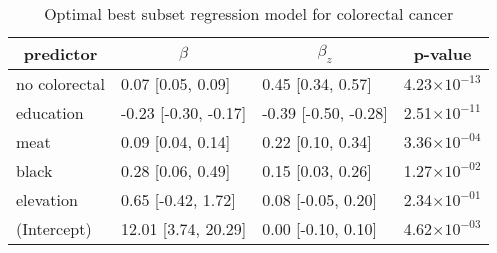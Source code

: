 \begin{table}[!tbp]
\caption{Optimal best subset regression model for colorectal cancer\label{SI_tab:colorectal}} 
\begin{center}
\begin{tabular}{llll}
\hline\hline
\multicolumn{1}{c}{predictor}&\multicolumn{1}{c}{$\beta$}&\multicolumn{1}{c}{$\beta_z$}&\multicolumn{1}{c}{p-value}\tabularnewline
\hline
no colorectal&0.07 [0.05, 0.09]&0.45 [0.34, 0.57]&4.23$\times10^{-13}$\tabularnewline
education&-0.23 [-0.30, -0.17]&-0.39 [-0.50, -0.28]&2.51$\times10^{-11}$\tabularnewline
meat&0.09 [0.04, 0.14]&0.22 [0.10, 0.34]&3.36$\times10^{-04}$\tabularnewline
black&0.28 [0.06, 0.49]&0.15 [0.03, 0.26]&1.27$\times10^{-02}$\tabularnewline
elevation&0.65 [-0.42, 1.72]&0.08 [-0.05, 0.20]&2.34$\times10^{-01}$\tabularnewline
(Intercept)&12.01 [3.74, 20.29]&0.00 [-0.10, 0.10]&4.62$\times10^{-03}$\tabularnewline
\hline
\end{tabular}\end{center}

\end{table}
